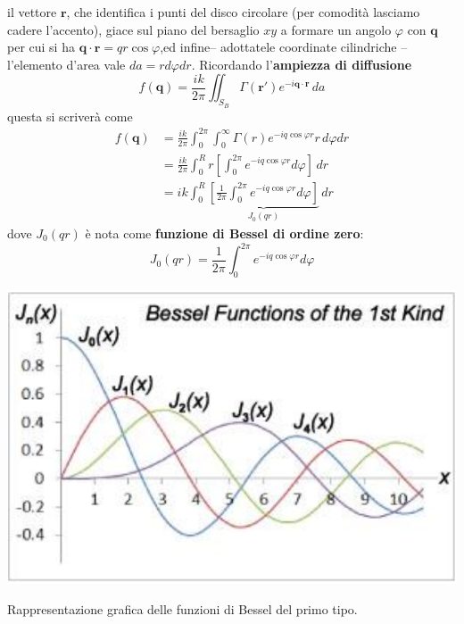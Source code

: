 il vettore \(\bm{r}\), che identifica i punti del disco circolare (per
comodità lasciamo cadere l'accento), giace sul piano del bersaglio
\(xy\) a formare un angolo \(\varphi\) con \(\bm{q}\) per cui si ha
\(\bm{q} \cdot \bm{r} = qr \cos \varphi\),ed infine-- adottatele
coordinate cilindriche -- l'elemento d'area vale
\(da = r d \varphi dr\).
Ricordando l'\textbf{ampiezza di diffusione}
\[
	f(\bm{q}) = \frac{ik}{2 \pi} \iint_{S_B} \Gamma(\bm{r}')e^{-i \bm{q} \cdot \bm{r}} \, da
\]
questa si scriverà come
\begin{align*}
	f(\bm{q}) & = \frac{ik}{2 \pi} \int_0^{2 \pi} \int_0^{\infty} \Gamma(r) e^{-iq \cos \varphi r} r \,d \varphi dr                      \\
	& = \frac{ik}{2 \pi} \int_0^R r \left[ \int_0^{2 \pi} e^{-iq \cos \varphi r} d \varphi \right] \, dr                       \\
	& = ik \int_0^R \underbrace{\left[ \frac{1}{2 \pi}\int_0^{2 \pi} e^{-iq \cos \varphi r} d \varphi \right]}_{J_0(qr)} \, dr
\end{align*}
dove \(J_0(qr)\) è nota come \textbf{funzione di Bessel di
ordine zero}:
\[
	J_0(qr) = \frac{1}{2 \pi}\int_0^{2 \pi} e^{-iq \cos \varphi r} d \varphi
\]

\begin{marginfigure}
	\includegraphics[width = 1.25 \textwidth, height = 1.25 \textheight]{figs/bessel-func-1st-kind}
	\caption{Rappresentazione grafica delle funzioni di Bessel del primo tipo.}
	\label{fig:bessel-func}
\end{marginfigure}

